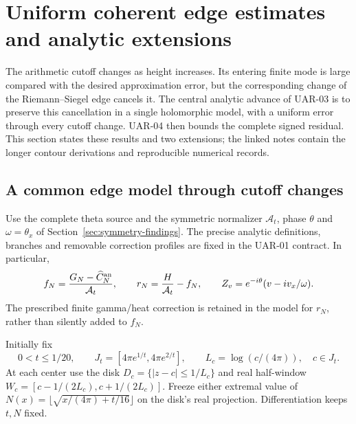 \section{Uniform coherent edge estimates and analytic extensions}
\label{sec:uniform-edge}

The arithmetic cutoff changes as height increases. Its entering finite
mode is large compared with the desired approximation error, but the
corresponding change of the Riemann--Siegel edge cancels it. The central
analytic advance of UAR-03 is to preserve this cancellation in a single
holomorphic model, with a uniform error through every cutoff change.
UAR-04 then bounds the complete signed residual. This section states
these results and two extensions; the linked notes contain the longer
contour derivations and reproducible numerical records.

\subsection{A common edge model through cutoff changes}

Use the complete theta source and the symmetric normalizer
$\mathcal A_t$, phase $\theta$ and $\omega=\theta_x$ of
Section~\ref{sec:symmetry-findings}. The precise analytic definitions,
branches and removable correction profiles are fixed in the
{UAR-01 contract}. In particular,
\[
 f_N=\frac{G_N-\widehat C_N^{\rm an}}{\mathcal A_t},
 \qquad r_N=\frac{H}{\mathcal A_t}-f_N,\qquad
 Z_v=e^{-i\theta}(v-i v_x/\omega).
\]
The prescribed finite gamma/heat correction is retained in the model
for $r_N$, rather than silently added to $f_N$.

Initially fix
\begin{equation}\label{eq:uar-sector}
 0<t\le1/20,\qquad
 J_t=[4\pi e^{1/t},4\pi e^{2/t}],\qquad
 L_c=\log(c/(4\pi)),\quad c\in J_t.
\end{equation}
At each center use the disk $D_c=\{|z-c|\le1/L_c\}$ and real
half-window $W_c=[c-1/(2L_c),c+1/(2L_c)]$.
Freeze either extremal value of
$N(x)=\lfloor\sqrt{x/(4\pi)+t/16}\rfloor$ on the disk's real
projection. Differentiation keeps $t,N$ fixed.

